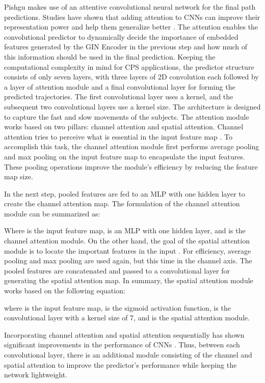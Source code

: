 \documentclass[sigconf]{acmart}
\begin{document}
Pishgu makes use of an attentive convolutional neural network for the final path predictions. Studies have shown that adding attention to CNNs can improve their representation power and help them generalize better \cite{cbam18}. The attention enables the convolutional predictor to dynamically decide the importance of embedded features generated by the GIN Encoder in the previous step and how much of this information should be used in the final prediction. Keeping the computational complexity in mind for CPS applications, the predictor structure consists of only seven layers, with three layers of 2D convolution each followed by a layer of attention module \cite{cbam18} and a final  convolutional layer for forming the predicted trajectories. The first convolutional layer uses a  kernel, and the subsequent two convolutional layers use a  kernel size. The architecture is designed to capture the fast and slow movements of the subjects. The attention module works based on two pillars: channel attention and spatial attention. Channel attention tries to perceive what is essential in the input feature map \cite{NIU202148}. To accomplish this task, the channel attention module first performs average pooling and max pooling on the input feature map to encapsulate the input features. These pooling operations improve the module's efficiency by reducing the feature map size. 


In the next step, pooled features are fed to an MLP with one hidden layer to create the channel attention map. The formulation of the channel attention module can be summarized as:

Where  is the input feature map,  is an MLP with one hidden layer, and  is the channel attention module. 
On the other hand, the goal of the spatial attention module is to locate the important features in the input \cite{NIU202148}. For efficiency, average pooling and max pooling are used again, but this time in the channel axis. The pooled features are concatenated and passed to a convolutional layer for generating the spatial attention map. In summary, the spatial attention module works based on the following equation:


where  is the input feature map,  is the sigmoid activation function,  is the convolutional layer with a kernel size of 7, and  is the spatial attention module. 

Incorporating channel attention and spatial attention sequentially has shown significant improvements in the performance of CNNs \cite{woo2018cbam}. Thus, between each convolutional layer, there is an additional module consisting of the channel and spatial attention to improve the predictor's performance while keeping the network lightweight.  
\end{document}
